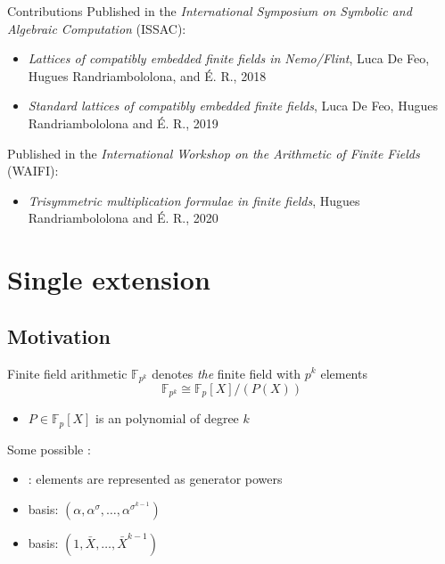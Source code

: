 \documentclass[xcolor=x11names,compress, aspectratio=43]{beamer}
\begin{document}
\begin{frame}{Contributions}
  Published in the \emph{International Symposium on Symbolic and Algebraic
  Computation} (ISSAC):
  \begin{itemize}
    \item \emph{Lattices of compatibly embedded finite fields in Nemo/Flint},
      Luca De Feo, Hugues Randriambololona, and É. R., 2018
    \item \emph{Standard lattices of compatibly embedded finite fields}, Luca De
      Feo, Hugues Randriambololona and É. R., 2019
  \end{itemize}
  Published in the \emph{International Workshop on the Arithmetic of Finite
  Fields} (WAIFI):
  \begin{itemize}
    \item \emph{Trisymmetric multiplication formulae in finite fields}, Hugues
      Randriambololona and É. R., 2020
  \end{itemize}
\end{frame}

\section{Single extension}
\subsection{Motivation}
\begin{frame}{Finite field arithmetic}
   $\mathbb{F}_{p^k}$ denotes \emph{the} finite field with $p^k$
  elements
  \[
    \mathbb{F}_{p^k} \cong \mathbb{F}_p[X]/(P(X))
  \]
  \begin{itemize}
    \item $P\in\mathbb{F}_p[X]$ is an  polynomial of degree $k$
  \end{itemize}
  Some possible :
  \begin{itemize}
    \item {}: elements are represented as generator
      powers
    \item {} basis: $(\alpha, \alpha^\sigma, \dots,
      \alpha^{\sigma^{k-1}})$
    \item {} basis: $(1, \bar X, \dots, \bar X^{k-1})$
  \end{itemize}
\end{frame}
\end{document}
